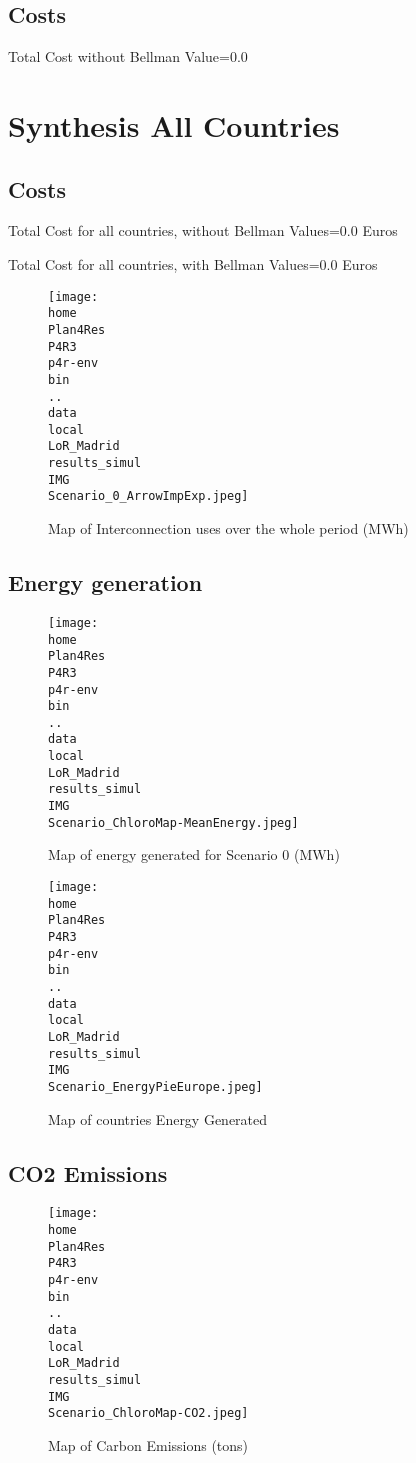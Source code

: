 \documentclass[10pt]{report}
\begin{document}
\subsection{Costs}

Total Cost without Bellman Value=0.0
\newpage\section{Synthesis All Countries}
\subsection{Costs}
Total Cost for all countries, without Bellman Values=0.0 Euros

Total Cost for all countries, with Bellman Values=0.0 Euros

\begin{figure}[H]
\centering
\texttt{[image: \\home\\Plan4Res\\P4R3\\p4r-env\\bin\\..\\data\\local\\LoR\_Madrid\\results\_simul\\IMG\\Scenario\_0\_ArrowImpExp.jpeg]}
\caption{Map of Interconnection uses over the whole period (MWh)}
\label{fig:Scenario_0_ArrowImpExp.jpeg}
\end{figure}
\subsection{Energy generation}
\begin{figure}[H]
\centering
\texttt{[image: \\home\\Plan4Res\\P4R3\\p4r-env\\bin\\..\\data\\local\\LoR\_Madrid\\results\_simul\\IMG\\Scenario\_ChloroMap-MeanEnergy.jpeg]}
\caption{Map of energy generated for Scenario 0 (MWh)}
\label{fig:Scenario_ChloroMap-MeanEnergy.jpeg}
\end{figure}
\begin{figure}[H]
\centering
\texttt{[image: \\home\\Plan4Res\\P4R3\\p4r-env\\bin\\..\\data\\local\\LoR\_Madrid\\results\_simul\\IMG\\Scenario\_EnergyPieEurope.jpeg]}
\caption{Map of countries Energy Generated}
\label{fig:Scenario_EnergyPieEurope.jpeg}
\end{figure}
\subsection{CO2 Emissions}
\begin{figure}[H]
\centering
\texttt{[image: \\home\\Plan4Res\\P4R3\\p4r-env\\bin\\..\\data\\local\\LoR\_Madrid\\results\_simul\\IMG\\Scenario\_ChloroMap-CO2.jpeg]}
\caption{Map of Carbon Emissions (tons)}
\label{fig:Scenario_ChloroMap-CO2.jpeg}
\end{figure}
\end{document}
